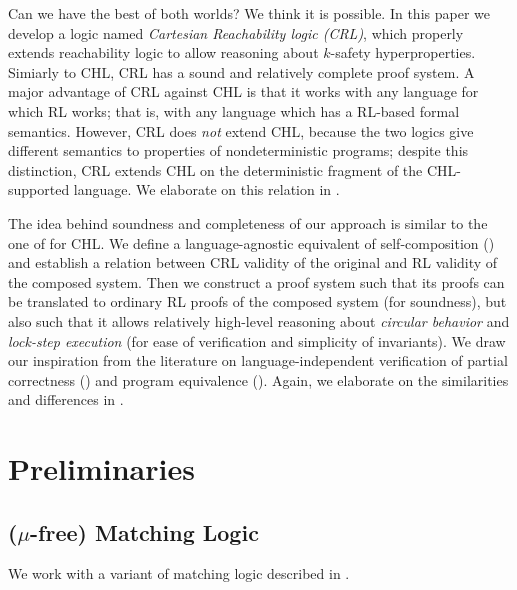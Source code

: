\documentclass{article}
\begin{document}
Can we have the best of both worlds? We think it is possible.
In this paper we develop a logic named \emph{Cartesian Reachability logic (CRL)}, which properly extends reachability logic
to allow reasoning about $k$-safety hyperproperties. Simiarly to CHL, CRL has a sound
and relatively complete proof system. A major advantage of CRL against CHL is that it works with any language
for which RL works; that is, with any language which has a RL-based formal semantics.
However, CRL does \emph{not} extend CHL, because the two logics give different semantics to properties of nondeterministic programs;
despite this distinction, CRL extends CHL on the deterministic fragment of the CHL-supported language.
We elaborate on this relation in . 

The idea behind soundness and completeness of our approach is similar to the one of \cite{SousaD16} for CHL.
We define a language-agnostic equivalent of self-composition (\cite{BartheDR11}) and establish a relation
between CRL validity of the original and RL validity of the composed system.
Then we construct a proof system such that its proofs can be translated to ordinary RL proofs of the composed system
(for soundness),
but also such that it allows relatively high-level reasoning about \emph{circular behavior} and \emph{lock-step execution}
(for ease of verification and simplicity of invariants).
We draw our inspiration from the literature on language-independent verification of partial correctness
(\cite{RosuS12oopsla,RosuSCM13lics,StefanescuCMMSR19})
and program equivalence (\cite{CiobacaLRR16,CiobacaLRR14}).
Again, we elaborate on the similarities and differences in . 

\section{Preliminaries}

\subsection{($\mu$-free) Matching Logic}

We work with a variant of matching logic described in
\cite{StefanescuCMMSR19,RosuSCM13lics}.
\end{document}
